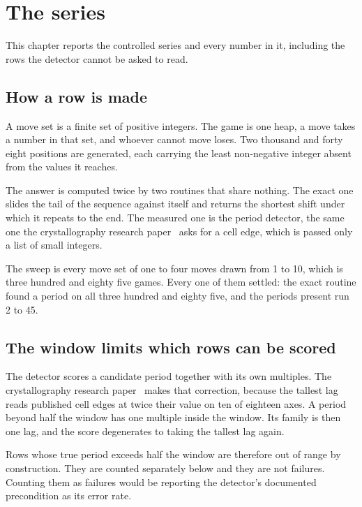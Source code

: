 \chapter{The series}

This chapter reports the controlled series and every number in it, including the rows the
detector cannot be asked to read.

\section{How a row is made}

A move set is a finite set of positive integers. The game is one heap, a move takes a number in that
set, and whoever cannot move loses. Two thousand and forty eight positions are generated, each
carrying the least non-negative integer absent from the values it reaches.

The answer is computed twice by two routines that share nothing. The exact one slides the tail of
the sequence against itself and returns the shortest shift under which it repeats to the end. The
measured one is the period detector, the same one the crystallography research paper~\cite{src:Quigg-crystallography} asks for a cell edge, which is passed only a list of small
integers.

The sweep is every move set of one to four moves drawn from 1 to 10, which is three hundred and
eighty five games. Every one of them settled: the exact routine found a period on all three hundred
and eighty five, and the periods present run 2 to 45.

\section{The window limits which rows can be scored}

The detector scores a candidate period together with its own multiples. The crystallography research paper~\cite{src:Quigg-crystallography} makes that
correction, because the tallest lag reads published cell edges at twice their value on ten of
eighteen axes. A period beyond half the window has one multiple inside the window. Its family is then one lag,
and the score degenerates to taking the tallest lag again.

Rows whose true period exceeds half the window are therefore out of range by construction. They are
counted separately below and they are not failures. Counting them as failures would be reporting the
detector's documented precondition as its error rate.

